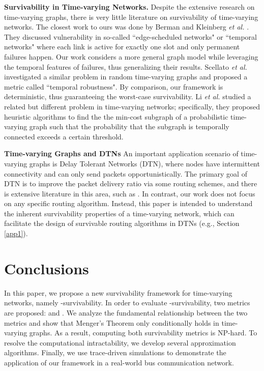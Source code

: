 \documentclass[10pt, conference, letterpaper]{IEEEtran}
\begin{document}
\vspace{1mm}

\noindent \textbf{Survivability in Time-varying Networks.} Despite the extensive research on time-varying graphs, there is very little literature on survivability of time-varying networks. The closest work to ours was done by Berman \cite{vul} and Kleinberg \emph{et al.} \cite{con}. They discussed vulnerability in so-called ``edge-scheduled networks" or ``temporal networks" where each link is active for exactly one slot and only permanent failures happen. Our work considers a more general graph model while leveraging the temporal features of failures, thus generalizing their results. Scellato \emph{et al.} \cite{TVG4} investigated a similar problem in random time-varying graphs and proposed a metric called ``temporal robustness". By comparison, our framework is deterministic, thus guaranteeing the worst-case survivability. Li \emph{et al.} \cite{TVG-unreliable} studied a related but different problem in time-varying networks; specifically, they proposed heuristic algorithms to find the the min-cost subgraph of a probabilistic time-varying graph such that the probability that the subgraph is temporally connected exceeds a certain threshold.

\vspace{1mm}

\noindent \textbf{Time-varying Graphs and DTNs} An important application scenario of time-varying graphs is Delay Tolerant Networks (DTN), where nodes have intermittent connectivity and can only send packets opportunistically. The primary goal of DTN is  to improve the packet delivery ratio via some routing schemes, and there is extensive literature in this area, such as \cite{redundancy, DTN_routing1, DTN_routing2, DTN_routing3, TVG-unreliable}. In contrast, our work does not focus on any specific routing algorithm. Instead, this paper is intended to understand the inherent survivability properties of a time-varying network, which can facilitate the design of survivable routing algorithms in DTNs (e.g., Section \ref{app1}).
\section{Conclusions}\label{conclusion}
In this paper, we propose a new survivability framework for time-varying networks, namely -survivability. In order to evaluate -survivability, two metrics are proposed:  and .
We analyze the fundamental relationship between the two metrics and show that Menger's Theorem only conditionally holds in time-varying graphs. As a result, computing both survivability metrics is NP-hard. To resolve the computational intractability, we develop several approximation algorithms. Finally, we use trace-driven simulations to demonstrate the application of our framework in a real-world bus communication network.
\end{document}

